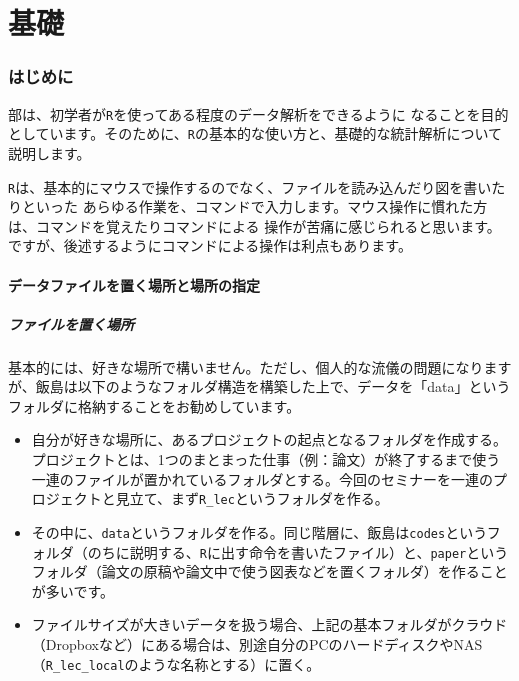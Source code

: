 %


\part{基礎}
\label{basic}
\section{はじめに}
\ref{basic}部は、初学者が\texttt{R}を使ってある程度のデータ解析をできるように
なることを目的としています。そのために、\texttt{R}の基本的な使い方と、基礎的な統計解析について説明します。

\texttt{R}は、基本的にマウスで操作するのでなく、ファイルを読み込んだり図を書いたりといった
あらゆる作業を、コマンドで入力します。マウス操作に慣れた方は、コマンドを覚えたりコマンドによる
操作が苦痛に感じられると思います。ですが、後述するようにコマンドによる操作は利点もあります。

  \subsection{データファイルを置く場所と場所の指定}
    \subsubsection{ファイルを置く場所}
基本的には、好きな場所で構いません。ただし、個人的な流儀の問題になりますが、飯島は以下のようなフォルダ構造を構築した上で、データを「data」というフォルダに格納することをお勧めしています。

\begin{itemize}
  \item 自分が好きな場所に、あるプロジェクトの起点となるフォルダを作成する。プロジェクトとは、1つのまとまった仕事（例：論文）が終了するまで使う一連のファイルが置かれているフォルダとする。今回のセミナーを一連のプロジェクトと見立て、まず\verb|R_lec|というフォルダを作る。
  \item その中に、\texttt{data}というフォルダを作る。同じ階層に、飯島は\texttt{codes}というフォルダ（のちに説明する、\texttt{R}に出す命令を書いたファイル）と、\texttt{paper}というフォルダ（論文の原稿や論文中で使う図表などを置くフォルダ）を作ることが多いです。
  \item ファイルサイズが大きいデータを扱う場合、上記の基本フォルダがクラウド（Dropboxなど）にある場合は、別途自分のPCのハードディスクやNAS（\verb|R_lec_local|のような名称とする）に置く。
\end{itemize}

